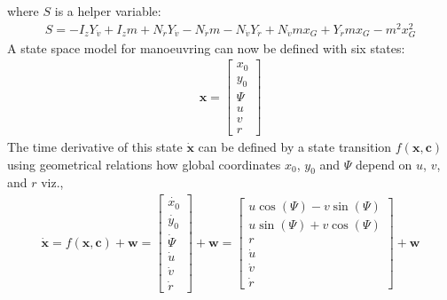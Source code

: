 \sphinxAtStartPar
where \(S\) is a helper variable:
\begin{equation}\label{equation:02.01_VMMs:eq_S}
\begin{split}\displaystyle S = - I_{z} Y_{\dot{v}} + I_{z} m + N_{\dot{r}} Y_{\dot{v}} - N_{\dot{r}} m - N_{\dot{v}} Y_{\dot{r}} + N_{\dot{v}} m x_{G} + Y_{\dot{r}} m x_{G} - m^{2} x_{G}^{2}\end{split}
\end{equation}
\sphinxAtStartPar
A state space model for manoeuvring can now be defined with six states:
\begin{equation}\label{equation:02.01_VMMs:eq_x}
\begin{split}\displaystyle \mathbf{x} = \left[\begin{matrix}x_{0}\\y_{0}\\\Psi\\u\\v\\r\end{matrix}\right]\end{split}
\end{equation}
\sphinxAtStartPar
The time derivative of this state \(\dot{\mathbf{x}}\) can be defined by a state transition \(f(\mathbf{x},\mathbf{c})\) using geometrical relations
how global coordinates \(x_0\), \(y_0\) and \(\Psi\) depend on \(u\), \(v\), and \(r\) viz.,
\begin{equation}\label{equation:02.01_VMMs:eqf}
\begin{split}\displaystyle \dot{\mathbf{x}} = f(\mathbf{x},\mathbf{c}) + \mathbf{w}
                                          = \left[\begin{matrix}\dot{x_0}\\ \dot{y_0} \\ \dot{\Psi} \\\dot{u}\\\dot{v}\\\dot{r}\end{matrix}\right] + \mathbf{w}
                                          = \left[\begin{matrix}u \cos{\left(\Psi \right)} - v \sin{\left(\Psi \right)}\\u \sin{\left(\Psi \right)} + v \cos{\left(\Psi \right)}\\r\\\dot{u}\\\dot{v}\\\dot{r}\end{matrix}\right] + \mathbf{w}\end{split}
\end{equation}

